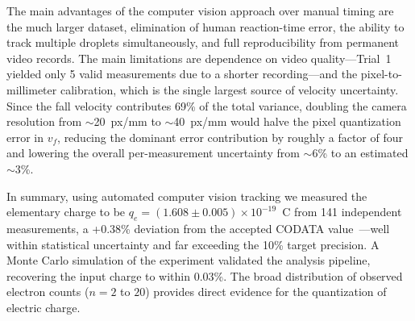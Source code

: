 \documentclass[%
 reprint,
 amsmath,amssymb,
 aps,
]{revtex4-2}
\begin{document}
The main advantages of the computer vision approach over manual timing are the much larger dataset, elimination of human reaction-time error, the ability to track multiple droplets simultaneously, and full reproducibility from permanent video records. The main limitations are dependence on video quality---Trial~1 yielded only 5 valid measurements due to a shorter recording---and the pixel-to-millimeter calibration, which is the single largest source of velocity uncertainty. Since the fall velocity contributes 69\% of the total variance, doubling the camera resolution from $\sim$20~px/mm to $\sim$40~px/mm would halve the pixel quantization error in $v_f$, reducing the dominant error contribution by roughly a factor of four and lowering the overall per-measurement uncertainty from $\sim$6\% to an estimated $\sim$3\%.

In summary, using automated computer vision tracking we measured the elementary charge to be $q_e = (1.608 \pm 0.005) \times 10^{-19}$~C from 141 independent measurements, a +0.38\% deviation from the accepted CODATA value~\cite{NIST-e-2022}---well within statistical uncertainty and far exceeding the 10\% target precision. A Monte Carlo simulation of the experiment validated the analysis pipeline, recovering the input charge to within 0.03\%. The broad distribution of observed electron counts ($n = 2$ to $20$) provides direct evidence for the quantization of electric charge.

\end{document}
